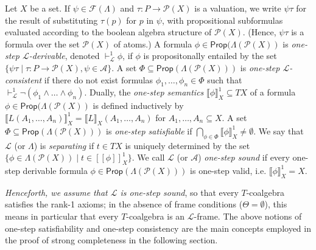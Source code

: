 \documentclass[proceedings]{stacs}
\theoremstyle{definition}
\theoremstyle{plain}
\newcommand{\Pow}{\mathcal{P}}
\newcommand{\Sem}[1]{{[\![#1]\!]}}
\newcommand{\entails}{\vdash}
\newcommand{\Lang}{\mathcal{L}}
\newcommand{\FLang}{\mathcal{F}}
\newcommand{\Prop}{\mathsf{Prop}}
\newcommand{\Ax}{\mathcal{A}}
\newcommand{\AtProp}{P}
\newcommand{\lsem}{\llbracket}
\newcommand{\rsem}{\rrbracket}
\begin{document}
\begin{defi}
  Let $X$ be a set. If $\psi \in \FLang(\Lambda)$ and $\tau: \AtProp
  \to \Pow(X)$ is a valuation, we write $\psi \tau$ for the result of
  substituting $\tau(p)$ for $p$ in $\psi$, with propositional
  subformulas evaluated according to the boolean algebra structure of
  $\Pow(X)$. (Hence, $\psi\tau$ is a formula over the set $\Pow(X)$ of
  atoms.)  A formula $\phi \in \Prop(\Lambda(\Pow(X))$ is
  \emph{one-step $\Lang$-derivable}, denoted $\entails^1_\Lang \phi$,
  if $\phi$ is propositonally entailed by the set $ \lbrace \psi \tau
  \mid \tau:\AtProp \to \Pow(X), \psi \in \Ax \rbrace$. A set $\Phi
  \subseteq \Prop(\Lambda(\Pow(X)))$ is \emph{one-step
    $\Lang$-consistent} if there do not exist formulas $\phi_1, \dots,
  \phi_n \in \Phi$ such that $\entails_\Lang^1
  \neg(\phi_1\land\dots\land\phi_n)$. Dually, the \emph{one-step
    semantics} $\lsem \phi \rsem_X^1 \subseteq T X$ of a formula $\phi
  \in \Prop(\Lambda(\Pow(X))$ is defined inductively by $\lsem L(A_1,
  \dots, A_n) \rsem_X^1 = \lsem L \rsem_X ( A_1, \dots, A_n)$ for
  $A_1, \dots, A_n \subseteq X$. A set $\Phi \subseteq
  \Prop(\Lambda(\Pow(X)))$ is \emph{one-step satisfiable} if
  $\bigcap_{\phi \in \Phi} \lsem \phi \rsem_X^1 \neq \emptyset$.  We
  say that $\Lang$ (or $\Lambda$) is \emph{separating} if $t\in TX$ is
  uniquely determined by the set $\{\phi\in\Lambda(\Pow(X))\mid
  t\in\Sem{\phi}^1_X\}$. We call $\Lang$ (or $\Ax$) \emph{one-step
    sound} if every one-step derivable formula $\phi \in
  \Prop(\Lambda(\Pow(X)))$ is one-step valid, i.e. $\lsem \phi
  \rsem_X^1 = X$.
\end{defi}
\noindent \emph{Henceforth, we assume that $\Lang$ is one-step sound},
so that every $T$-coalgebra satisfies the rank-1 axioms; in the
absence of frame conditions ($\Theta = \emptyset$), this means in
particular that every $T$-coalgebra is an $\Lang$-frame. The above
notions of one-step satisfiability and one-step consistency are the
main concepts employed in the proof of strong completeness in the
following section. 
\end{document}
